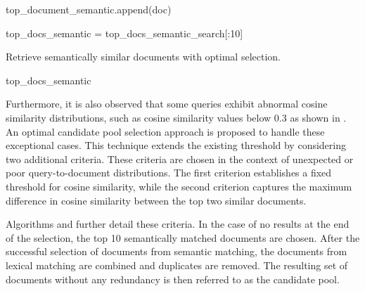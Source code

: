 \begin{algorithm}[H]
{{			
			{
				top\_document\_semantic.append(doc)\;
			}

		}
		\;
		
		
		{
		top\_docs\_semantic = top\_docs\_semantic\_search[:10]\;
		}
		\;

		 	\caption{Retrieve semantically similar documents with optimal selection.} \label{algo:optimal_selection}
		\KwRet top\_docs\_semantic\;
	}
	
\end{algorithm}


Furthermore, it is also observed that some queries exhibit abnormal cosine similarity distributions, such as cosine similarity values below 0.3 as shown in . An optimal candidate pool selection approach is proposed to handle these exceptional cases. This technique extends the existing threshold by considering two additional criteria. These criteria are chosen in the context of unexpected or poor query-to-document distributions. The first criterion establishes a fixed threshold for cosine similarity, while the second criterion captures the maximum difference in cosine similarity between the top two similar documents.

 Algorithms  and  further detail these criteria. In the case of no results at the end of the selection, the top 10 semantically matched documents are chosen. After the successful selection of documents from semantic matching, the documents from lexical matching are combined and duplicates are removed. The resulting set of documents without any redundancy is then referred to as the candidate pool.

